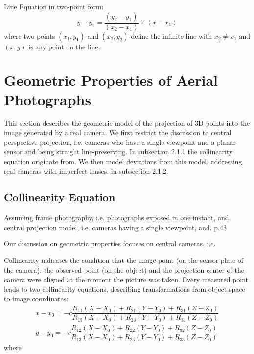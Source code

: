 Line Equation in two-point form:
\begin{equation} \label{eq:2.1}
y-y_1 = \dfrac{(y_2-y_1)}{(x_2-x_1)}\times(x-x_1)
\end{equation}
where two points $(x_1,y_1)$ and $(x_2,y_2)$ define the infinite line with $x_2\neq x_1$ and $(x,y)$ is any point on the line.


\section{Geometric Properties of Aerial Photographs}
\label{sec:2.3}

This section describes the geometric model of the projection of 3D points into the image generated by a real camera. We first restrict the discussion to central perspective projection, i.e. cameras who have a single viewpoint and a planar sensor and being straight line-preserving. In subsection 2.1.1 the collinearity equation originate from. We then model deviations from this model, addressing real cameras with imperfect lenses, in subsection 2.1.2.

\subsection{Collinearity Equation}

Assuming frame photography, i.e. photographs exposed in one instant, and central projection model, i.e. cameras having a single viewpoint, and.
p.43

Our discussion on geometric properties focuses on central cameras, i.e.

Collinearity indicates the condition that the image point (on the sensor plate of the camera), the observed point (on the object) and the projection center of the camera were aligned at the moment the picture was taken. Every measured point leads to two collinearity equations, describing transformations from object space to image coordinates:
\begin{equation} \label{eq:2.3}
\begin{aligned}
x - x_0 = -c \dfrac {R_{11}(X-X_0) + R_{21}(Y-Y_0) + R_{31}(Z-Z_0)} {R_{13}(X-X_0) + R_{23}(Y-Y_0) + R_{33}(Z-Z_0)} \\
y - y_0 = -c \dfrac {R_{12}(X-X_0) + R_{22}(Y-Y_0) + R_{32}(Z-Z_0)} {R_{13}(X-X_0) + R_{23}(Y-Y_0) + R_{33}(Z-Z_0)}
\end{aligned}
\end{equation}
where\newline

